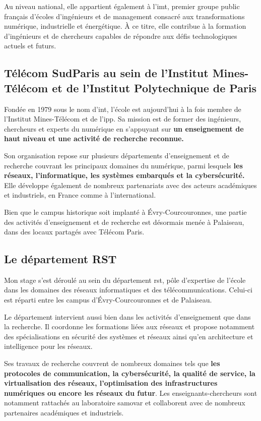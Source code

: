 \documentclass[12pt, a4paper]{report}
\begin{document}
	Au niveau national, elle appartient également à l'\gls{imt}, premier groupe public français d'écoles d'ingénieurs et de management consacré aux transformations numérique, industrielle et énergétique. À ce titre, elle contribue à la formation d'ingénieurs et de chercheurs capables de répondre aux défis technologiques actuels et futurs.

	\subsection{Télécom SudParis au sein de l'Institut Mines-Télécom et de l'Institut Polytechnique de Paris}

	Fondée en 1979 sous le nom d'\gls{int}, l'école est aujourd'hui à la fois membre de l'Institut Mines-Télécom et de l'\gls{ipp}. Sa mission est de former des ingénieurs, chercheurs et experts du numérique en s'appuyant sur \textbf{un enseignement de haut niveau et une activité de recherche reconnue.}

	Son organisation repose sur plusieurs départements d'enseignement et de recherche couvrant les principaux domaines du numérique, parmi lesquels \textbf{les réseaux, l'informatique, les systèmes embarqués et la cybersécurité.} Elle développe également de nombreux partenariats avec des acteurs académiques et industriels, en France comme à l'international.

	Bien que le campus historique soit implanté à Évry-Courcouronnes, une partie des activités d'enseignement et de recherche est désormais menée à Palaiseau, dans des locaux partagés avec Télécom Paris.

	\subsection{Le département RST}

	Mon stage s'est déroulé au sein du département \gls{rst}, pôle d'expertise de l'école dans les domaines des réseaux informatiques et des télécommunications. Celui-ci est réparti entre les campus d'Évry-Courcouronnes et de Palaiseau.

	Le département intervient aussi bien dans les activités d'enseignement que dans la recherche. Il coordonne les formations liées aux réseaux et propose notamment des spécialisations en sécurité des systèmes et réseaux ainsi qu'en architecture et intelligence pour les réseaux.

	Ses travaux de recherche couvrent de nombreux domaines tels que \textbf{les protocoles de communication, la cybersécurité, la qualité de service, la virtualisation des réseaux, l'optimisation des infrastructures numériques ou encore les réseaux du futur}. Les enseignants-chercheurs sont notamment rattachés au laboratoire \gls{samovar} et collaborent avec de nombreux partenaires académiques et industriels.
\end{document}
